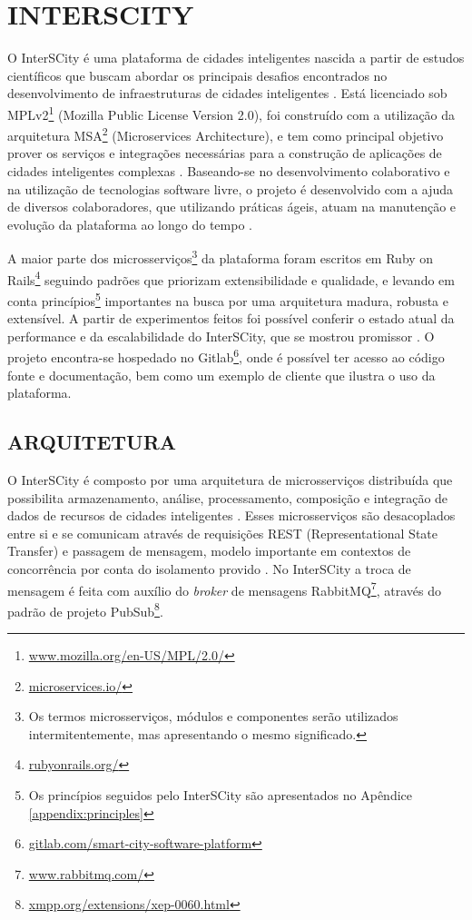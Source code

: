 \chapter[INTERSCITY]{INTERSCITY}
\label{chapter:interscity}

O InterSCity é uma plataforma de cidades inteligentes nascida a partir de
estudos científicos que buscam abordar os principais desafios encontrados
no desenvolvimento de infraestruturas de cidades inteligentes \cite{nof2016}.
Está licenciado sob
MPLv2\footnote{\url{www.mozilla.org/en-US/MPL/2.0/}} (Mozilla Public License
Version 2.0), foi construído com a
utilização da arquitetura MSA\footnote{\url{microservices.io/}} (Microservices
Architecture), e tem como principal objetivo prover os
serviços e integrações necessárias para a construção de aplicações de cidades
inteligentes complexas \cite{delesposte2017}. Baseando-se no desenvolvimento
colaborativo e na utilização de tecnologias software livre, o projeto é
desenvolvido com a ajuda de diversos colaboradores, que utilizando práticas
ágeis, atuam na manutenção e evolução da plataforma ao longo do tempo
\cite{delesposte2017}.

A maior parte dos microsserviços\footnote{Os termos microsserviços, módulos e
componentes serão utilizados intermitentemente, mas apresentando o mesmo
significado.} da plataforma foram escritos em Ruby on Rails\footnote{\url{rubyonrails.org/}}
seguindo padrões que priorizam extensibilidade e qualidade, e levando em conta
princípios\footnote{Os princípios seguidos pelo InterSCity são apresentados no
Apêndice \ref{appendix:principles}} importantes na busca por uma arquitetura madura,
robusta e extensível. A partir de experimentos feitos foi possível conferir
o estado atual da performance e da escalabilidade do InterSCity, que se mostrou
promissor \cite{delesposte2017}. O projeto encontra-se hospedado no
Gitlab\footnote{\url{gitlab.com/smart-city-software-platform}},
onde é possível ter acesso ao código fonte e documentação, bem como um exemplo de
cliente que ilustra o uso da plataforma.

\section{ARQUITETURA}
\label{sec:architecture}

O InterSCity é composto por uma arquitetura de microsserviços distribuída
que possibilita armazenamento, análise, processamento, composição e
integração de dados de recursos de cidades inteligentes \cite{delesposte2017}.
Esses microsserviços são desacoplados entre si e se comunicam através de requisições REST
(Representational State Transfer) e passagem de mensagem, modelo importante em
contextos de concorrência por conta do isolamento provido \cite{armstrong2003}.
No InterSCity a troca de mensagem é feita com auxílio do \textit{broker} de
mensagens RabbitMQ\footnote{\url{www.rabbitmq.com/}}, através do padrão de
projeto PubSub\footnote{\url{xmpp.org/extensions/xep-0060.html}}.

